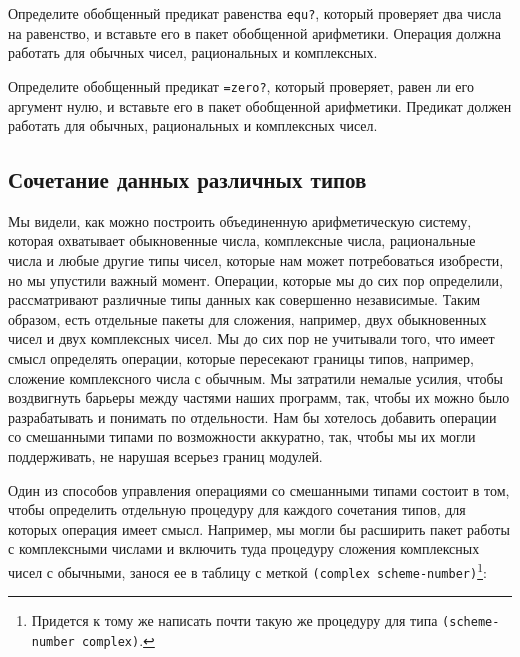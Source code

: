 \begin{exercise}{2.79}\label{EX2.79}%
Определите обобщенный 
предикат равенства {\tt equ?}, 
который проверяет два числа на равенство, и
вставьте его в пакет обобщенной арифметики.  Операция должна
работать для обычных чисел, рациональных и комплексных.
\end{exercise}
\begin{exercise}{2.80}\label{EX2.80}%
Определите обобщенный предикат {\tt =zero?},
который проверяет, равен ли его аргумент нулю, и вставьте его в
пакет обобщенной арифметики.  Предикат должен работать для обычных, рациональных и комплексных чисел.
\end{exercise}

\subsection{Сочетание данных различных типов}
\label{COMBINING-DATA-OF-DIFFERENT-TYPES}


Мы видели, как можно построить объединенную арифметическую
систему, которая охватывает обыкновенные числа, комплексные числа,
рациональные числа и любые другие типы чисел, которые нам может
потребоваться изобрести, но мы упустили важный момент.  Операции,
которые мы до сих пор определили, рассматривают различные типы данных
как совершенно независимые.  Таким образом, есть отдельные пакеты для
сложения, например, двух обыкновенных чисел и двух комплексных чисел.
Мы до сих пор не учитывали того, что имеет смысл определять операции,
которые пересекают границы типов, например, сложение комплексного
числа с обычным.  Мы затратили немалые усилия, чтобы воздвигнуть
барьеры между частями наших программ, так, чтобы их можно было
разрабатывать и понимать по отдельности.  Нам бы хотелось добавить
операции со смешанными типами по возможности аккуратно, так, чтобы мы их 
могли поддерживать, не нарушая всерьез границ модулей.

Один из способов управления 
операциями со смешанными типами
состоит в том, чтобы определить отдельную процедуру для каждого
сочетания типов, для которых операция имеет смысл.  Например, мы могли
бы расширить пакет работы с комплексными числами и включить туда
процедуру сложения комплексных чисел с обычными, занося ее в таблицу с
меткой {\tt (complex scheme-number)}\footnote{Придется к тому же написать почти такую же 
процедуру для типа {\tt (scheme-number complex)}.}:

